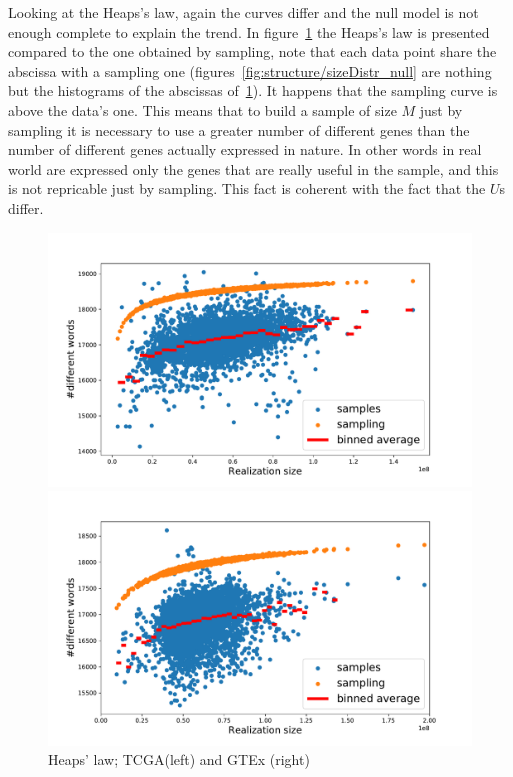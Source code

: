 Looking at the Heaps's law, again the curves differ and the null model is not enough complete to explain the trend. In figure~\ref{fig:structure/heaps_null} the Heaps's law is presented compared to the one obtained by sampling, note that each data point share the abscissa with a sampling one (figures~\ref{fig:structure/sizeDistr_null} are nothing but the histograms of the abscissas of~\ref{fig:structure/heaps_null}). It happens that the sampling curve is above the data's one. This means that to build a sample of size $M$ just by sampling it is necessary to use a greater number of different genes than the number of different genes actually expressed in nature. In other words in real world are expressed only the genes that are really useful in the sample, and this is not repricable just by sampling. This fact is coherent with the fact that the $U$s differ.
\begin{figure}[htb!]
\begin{minipage}{0.5\textwidth}
    \centering
    \includegraphics[width=0.95\linewidth]{pictures/structure/tcga/heaps_null.pdf}
    \end{minipage}
\hspace{2mm}
\begin{minipage}{0.5\textwidth}
    \centering
    \includegraphics[width=0.95\linewidth]{pictures/structure/gtex/heaps_null.pdf}
    \end{minipage}
\caption{Heaps' law; TCGA(left) and GTEx (right)}
\label{fig:structure/heaps_null}
\end{figure}
